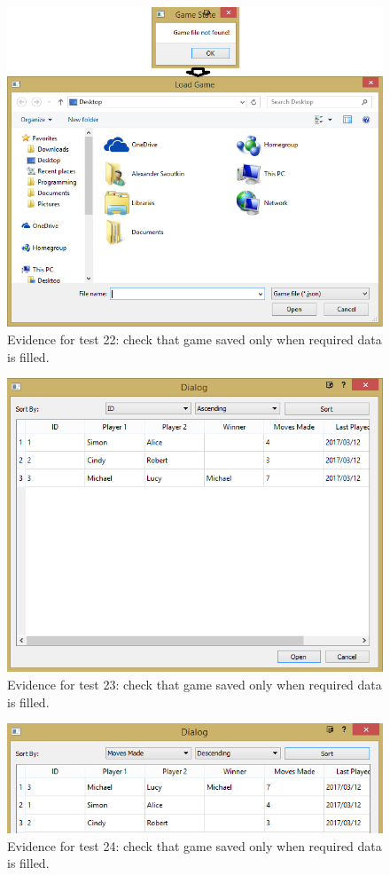 \documentclass[twoside, 12pt]{report}
\begin{document}
\begin{figure}[H]
	\centering
	\includegraphics[width=1.0\textwidth]{images/screenshots/test-22}
	\caption{Evidence for test 22: check that game saved only when required data is filled.}
	\label{test-22}
\end{figure}
\begin{figure}[H]
	\centering
	\includegraphics[width=1.0\textwidth]{images/screenshots/test-23}
	\caption{Evidence for test 23: check that game saved only when required data is filled.}
	\label{test-23}
\end{figure}
\begin{figure}[H]
	\centering
	\includegraphics[width=1.0\textwidth]{images/screenshots/test-24}
	\caption{Evidence for test 24: check that game saved only when required data is filled.}
	\label{test-24}
\end{figure}
\end{document}
